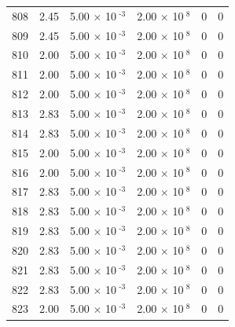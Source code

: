 \documentclass[a4paper,11pt]{article}
\begin{document}
\begin{center}
\begin{longtable}{|R{1.5cm}|R{2.4cm}|R{2.4cm}|R{2.4cm}|R{2.4cm}|R{2.4cm}|}
  808 &   2.45  &         5.00 $\times$ 10$^{\text{          -3}}$  &         2.00 $\times$ 10$^{\text{           8}}$  & 0  & 0 \\
  809 &   2.45  &         5.00 $\times$ 10$^{\text{          -3}}$  &         2.00 $\times$ 10$^{\text{           8}}$  & 0  & 0 \\
  810 &   2.00  &         5.00 $\times$ 10$^{\text{          -3}}$  &         2.00 $\times$ 10$^{\text{           8}}$  & 0  & 0 \\
  811 &   2.00  &         5.00 $\times$ 10$^{\text{          -3}}$  &         2.00 $\times$ 10$^{\text{           8}}$  & 0  & 0 \\
  812 &   2.00  &         5.00 $\times$ 10$^{\text{          -3}}$  &         2.00 $\times$ 10$^{\text{           8}}$  & 0  & 0 \\
  813 &   2.83  &         5.00 $\times$ 10$^{\text{          -3}}$  &         2.00 $\times$ 10$^{\text{           8}}$  & 0  & 0 \\
  814 &   2.83  &         5.00 $\times$ 10$^{\text{          -3}}$  &         2.00 $\times$ 10$^{\text{           8}}$  & 0  & 0 \\
  815 &   2.00  &         5.00 $\times$ 10$^{\text{          -3}}$  &         2.00 $\times$ 10$^{\text{           8}}$  & 0  & 0 \\
  816 &   2.00  &         5.00 $\times$ 10$^{\text{          -3}}$  &         2.00 $\times$ 10$^{\text{           8}}$  & 0  & 0 \\
  817 &   2.83  &         5.00 $\times$ 10$^{\text{          -3}}$  &         2.00 $\times$ 10$^{\text{           8}}$  & 0  & 0 \\
  818 &   2.83  &         5.00 $\times$ 10$^{\text{          -3}}$  &         2.00 $\times$ 10$^{\text{           8}}$  & 0  & 0 \\
  819 &   2.83  &         5.00 $\times$ 10$^{\text{          -3}}$  &         2.00 $\times$ 10$^{\text{           8}}$  & 0  & 0 \\
  820 &   2.83  &         5.00 $\times$ 10$^{\text{          -3}}$  &         2.00 $\times$ 10$^{\text{           8}}$  & 0  & 0 \\
  821 &   2.83  &         5.00 $\times$ 10$^{\text{          -3}}$  &         2.00 $\times$ 10$^{\text{           8}}$  & 0  & 0 \\
  822 &   2.83  &         5.00 $\times$ 10$^{\text{          -3}}$  &         2.00 $\times$ 10$^{\text{           8}}$  & 0  & 0 \\
  823 &   2.00  &         5.00 $\times$ 10$^{\text{          -3}}$  &         2.00 $\times$ 10$^{\text{           8}}$  & 0  & 0 \\

\end{longtable}
\end{center}
\end{document}
